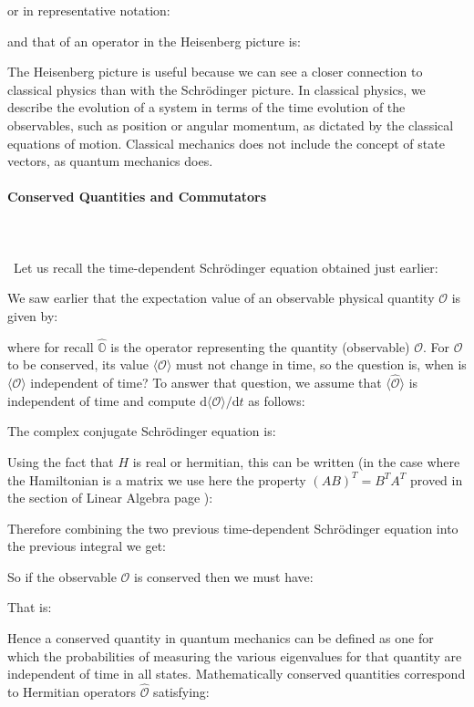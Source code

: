 	or in representative notation:
	
	and that of an operator in the Heisenberg picture is:
	
	The Heisenberg picture is useful because we can see a closer connection to classical physics than with the Schrödinger picture. In classical physics, we describe the evolution of a system in terms of the time evolution of the observables, such as position or angular momentum, as dictated by the classical equations of motion. Classical mechanics does not include the concept of state vectors, as quantum mechanics does.
	
	\paragraph{Conserved Quantities and Commutators}\mbox{}\\\\\
	Let us recall the time-dependent Schrödinger equation obtained just earlier:
	
	We saw earlier that the expectation value of an observable physical quantity $\mathcal{O}$ is given by:
	
	where for recall $\hat{\mathbb{O}}$ is the operator representing the quantity (observable) $\mathcal{O}$. For $\mathcal{O}$ to be conserved, its value $\langle \mathcal{O} \rangle$ must not change in time, so the question is, when is  $\langle \mathcal{O} \rangle$ independent of time? To answer that question, we assume that  $\langle \hat{\mathcal{O}} \rangle$ is independent of time and compute $\mathrm{d}\langle \mathcal{O} \rangle/\mathrm{d}t$ as follows:
	
	The complex conjugate Schrödinger equation is:
	
	Using the fact that $H$ is real or hermitian, this can be written (in the case where the Hamiltonian is a matrix we use here the property $(AB)^T=B^TA^T$ proved in the section of Linear Algebra page \pageref{transposed matrix}):
	
	Therefore combining the two previous time-dependent Schrödinger equation into the previous integral we get:
	
	So if the observable $\mathcal{O}$ is conserved then we must have:
	
	That is:
	
	Hence a conserved quantity in quantum mechanics can be defined as one for which the probabilities of measuring the various eigenvalues for that quantity are independent of time in all states. Mathematically conserved quantities correspond to Hermitian operators $\hat{\mathcal{O}}$ satisfying:
	
